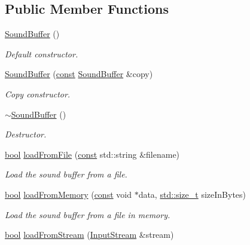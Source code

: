 \subsection*{Public Member Functions}
\begin{DoxyCompactItemize}
\item 
\hyperlink{classsf_1_1_sound_buffer_a0cabfbfe19b831bf7d5c9592d92ef233}{Sound\-Buffer} ()
\begin{DoxyCompactList}\small\item\em Default constructor. \end{DoxyCompactList}\item 
\hyperlink{classsf_1_1_sound_buffer_aaf000fc741ff27015907e8588263f4a6}{Sound\-Buffer} (\hyperlink{term__entry_8h_a57bd63ce7f9a353488880e3de6692d5a}{const} \hyperlink{classsf_1_1_sound_buffer}{Sound\-Buffer} \&copy)
\begin{DoxyCompactList}\small\item\em Copy constructor. \end{DoxyCompactList}\item 
\hyperlink{classsf_1_1_sound_buffer_aea240161724ffba74a0d6a9e277d3cd5}{$\sim$\-Sound\-Buffer} ()
\begin{DoxyCompactList}\small\item\em Destructor. \end{DoxyCompactList}\item 
\hyperlink{term__entry_8h_a002004ba5d663f149f6c38064926abac}{bool} \hyperlink{classsf_1_1_sound_buffer_a2be6a8025c97eb622a7dff6cf2594394}{load\-From\-File} (\hyperlink{term__entry_8h_a57bd63ce7f9a353488880e3de6692d5a}{const} std\-::string \&filename)
\begin{DoxyCompactList}\small\item\em Load the sound buffer from a file. \end{DoxyCompactList}\item 
\hyperlink{term__entry_8h_a002004ba5d663f149f6c38064926abac}{bool} \hyperlink{classsf_1_1_sound_buffer_af8cfa5599739a7edae69c5cba273d33f}{load\-From\-Memory} (\hyperlink{term__entry_8h_a57bd63ce7f9a353488880e3de6692d5a}{const} void $\ast$data, \hyperlink{nc__alloc_8h_a7b60c5629e55e8ec87a4547dd4abced4}{std\-::size\-\_\-t} size\-In\-Bytes)
\begin{DoxyCompactList}\small\item\em Load the sound buffer from a file in memory. \end{DoxyCompactList}\item 
\hyperlink{term__entry_8h_a002004ba5d663f149f6c38064926abac}{bool} \hyperlink{classsf_1_1_sound_buffer_ad292156b1e01f6dabd4c0c277d5e079e}{load\-From\-Stream} (\hyperlink{classsf_1_1_input_stream}{Input\-Stream} \&stream)

\end{DoxyCompactItemize}
